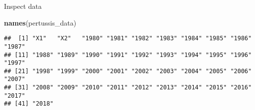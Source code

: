 \documentclass[ignorenonframetext,]{beamer}
\newenvironment{Shaded}{\begin{snugshade}}{\end{snugshade}}
\newcommand{\KeywordTok}[1]{\textcolor[rgb]{0.13,0.29,0.53}{\textbf{#1}}}
\newcommand{\NormalTok}[1]{#1}
\begin{document}
\begin{frame}[fragile]
\begin{block}{Inspect data}
\begin{Shaded}
\begin{Highlighting}[]
\KeywordTok{names}\NormalTok{(pertussis_data)}
\end{Highlighting}
\end{Shaded}

\begin{verbatim}
##  [1] "X1"   "X2"   "1980" "1981" "1982" "1983" "1984" "1985" "1986" "1987"
## [11] "1988" "1989" "1990" "1991" "1992" "1993" "1994" "1995" "1996" "1997"
## [21] "1998" "1999" "2000" "2001" "2002" "2003" "2004" "2005" "2006" "2007"
## [31] "2008" "2009" "2010" "2011" "2012" "2013" "2014" "2015" "2016" "2017"
## [41] "2018"
\end{verbatim}

\end{block}

\end{frame}
\end{document}
